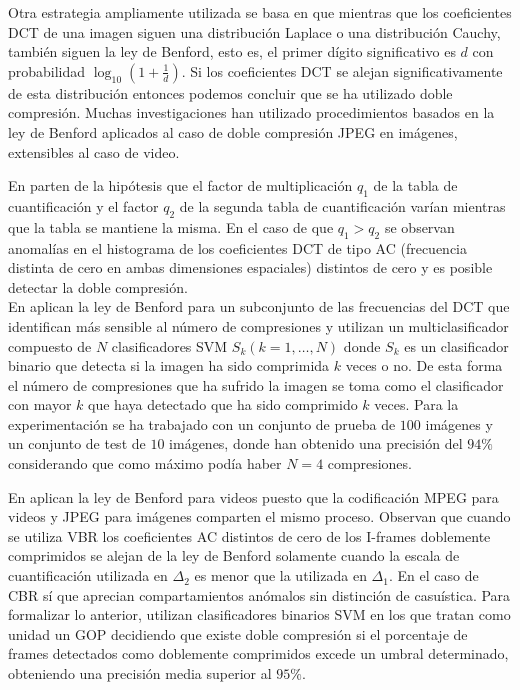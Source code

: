 Otra estrategia ampliamente utilizada se basa en que mientras que los coeficientes DCT de una imagen siguen una distribución Laplace\cite{reininger:1983} o una distribución Cauchy\cite{eggerton:1986}, también siguen la ley de Benford\cite{fu:2009}, esto es, el primer dígito significativo es $d$ con probabilidad $\log_{10}\left(1+\frac{1}{d}\right)$. Si los coeficientes DCT se alejan significativamente de esta distribución entonces podemos concluir que se ha utilizado doble compresión. Muchas investigaciones han utilizado procedimientos basados en la ley de Benford aplicados al caso de doble compresión JPEG en imágenes, extensibles al caso de video. 

En \cite{wang:2009} parten de la hipótesis que el factor de multiplicación $q_1$ de la tabla de cuantificación y el factor $q_2$ de la segunda tabla de cuantificación varían mientras que la tabla se mantiene la misma. En el caso de que $q_1 > q_2$ se observan anomalías en el histograma de los coeficientes DCT de tipo AC (frecuencia distinta de cero en ambas dimensiones espaciales) distintos de cero y es posible detectar la doble compresión. \\

En \cite{milani:2012} aplican la ley de Benford para un subconjunto de las frecuencias del DCT que identifican más sensible al número de compresiones y utilizan un multiclasificador compuesto de $N$ clasificadores SVM $S_k (k=1, \dots, N)$ donde $S_k$ es un clasificador binario que detecta si la imagen ha sido comprimida $k$ veces o no. De esta forma el número de compresiones que ha sufrido la imagen se toma como el clasificador con mayor $k$ que haya detectado que ha sido comprimido $k$ veces. Para la experimentación se ha trabajado con un conjunto de prueba de $100$ imágenes y un conjunto de test de $10$ imágenes, donde han obtenido una precisión del $94\%$ considerando que como máximo podía haber $N=4$ compresiones.

En \cite{chen:2009} aplican la ley de Benford para videos puesto que la codificación MPEG para videos y JPEG para imágenes comparten el mismo proceso. Observan que cuando se utiliza VBR los coeficientes AC distintos de cero de los I-frames doblemente comprimidos se alejan de la ley de Benford solamente cuando la escala de cuantificación utilizada en $\Delta_2$ es menor que la utilizada en $\Delta_1$. En el caso de CBR sí que aprecian compartamientos anómalos sin distinción de casuística. Para formalizar lo anterior, utilizan clasificadores binarios SVM en los que tratan como unidad un GOP decidiendo que existe doble compresión si el porcentaje de frames detectados como doblemente comprimidos excede un umbral determinado, obteniendo una precisión media superior al $95\%$. \\

